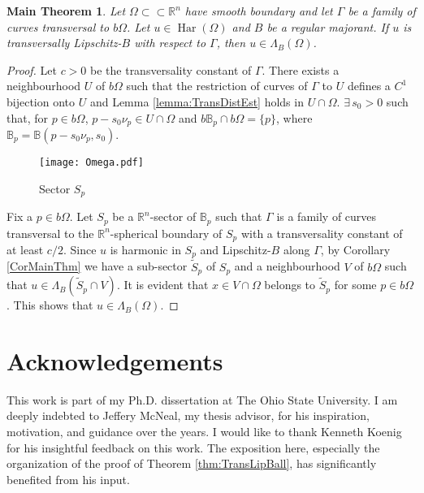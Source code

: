 \documentclass[12pt,a4paper]{amsart}
\numberwithin{equation}{section}
\newtheorem*{mainthm}{Main Theorem}
\theoremstyle{definition}
\begin{document}
\begin{mainthm} Let $\Omega \subset\subset \mathbb{R}^n$ have smooth boundary and let $\Gamma$ be a family of curves transversal to $b\Omega$. Let $u\in\operatorname{\operatorname{Har}}(\Omega)$ and 
$B$ be a regular majorant. If $u$ is transversally Lipschitz-$B$ with respect to $\Gamma$, then $u\in\Lambda_B(\Omega)$.
\end{mainthm}
\begin{proof}
Let $c>0$ be the transversality constant of $\Gamma$. There exists a neighbourhood $U$ of $b\Omega$ such that the restriction of curves of $\Gamma$ to $U$ defines a $C^1$ bijection onto $U$ and Lemma 
\ref{lemma:TransDistEst} holds in $U\cap\Omega$. $\exists\, s_0>0$ such that, for $p\in b\Omega$, $p-s_0\nu_p \in U\cap\Omega$  and $\displaystyle b\mathbb{B}_p \cap b\Omega = \{p\}$, where 
$\mathbb{B}_p=\mathbb{B}(p-s_0\nu_p,s_0)$.
\begin{figure}[h]
\begin{center}
\texttt{[image: Omega.pdf]}
\caption{Sector $S_p$}
\end{center}
\end{figure}
Fix a $p\in b\Omega$. Let $S_p$ be a $\mathbb{R}^n$-sector of $\mathbb{B}_p$ such that $\Gamma$ is a family of curves transversal to the $\mathbb{R}^n$-spherical boundary of $S_p$ with a transversality constant of at least 
$c/2$. Since $u$ is harmonic in $S_p$ and Lipschitz-$B$ along $\Gamma$, by Corollary \ref{CorMainThm} we have a sub-sector $\widetilde{S}_p$ of $S_p$ and a neighbourhood $V$ of $b\Omega$ such that 
$u\in \Lambda_{B}(\widetilde{S}_p\cap V)$. It is evident that $x\in V\cap\Omega$ belongs to $\widetilde{S}_p$ for some $p\in b\Omega$. This shows that $u\in\Lambda_{B}(\Omega)$.
\end{proof}

\section*{Acknowledgements}

This work is part of my Ph.D. dissertation \cite{Rav11} at The Ohio State University. I am deeply indebted to Jeffery McNeal, my thesis advisor, for his inspiration, motivation, and guidance over the years. I 
would like to thank Kenneth Koenig for his insightful feedback on this work. The exposition here, especially the organization of the proof of Theorem \ref{thm:TransLipBall}, has significantly benefited from his 
input.
\end{document}
